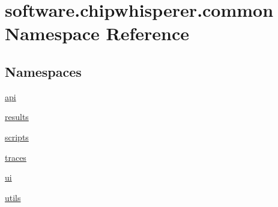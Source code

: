 \hypertarget{namespacesoftware_1_1chipwhisperer_1_1common}{}\section{software.\+chipwhisperer.\+common Namespace Reference}
\label{namespacesoftware_1_1chipwhisperer_1_1common}
\subsection*{Namespaces}
\begin{DoxyCompactItemize}
\item 
 \hyperlink{namespacesoftware_1_1chipwhisperer_1_1common_1_1api}{api}
\item 
 \hyperlink{namespacesoftware_1_1chipwhisperer_1_1common_1_1results}{results}
\item 
 \hyperlink{namespacesoftware_1_1chipwhisperer_1_1common_1_1scripts}{scripts}
\item 
 \hyperlink{namespacesoftware_1_1chipwhisperer_1_1common_1_1traces}{traces}
\item 
 \hyperlink{namespacesoftware_1_1chipwhisperer_1_1common_1_1ui}{ui}
\item 
 \hyperlink{namespacesoftware_1_1chipwhisperer_1_1common_1_1utils}{utils}
\end{DoxyCompactItemize}
